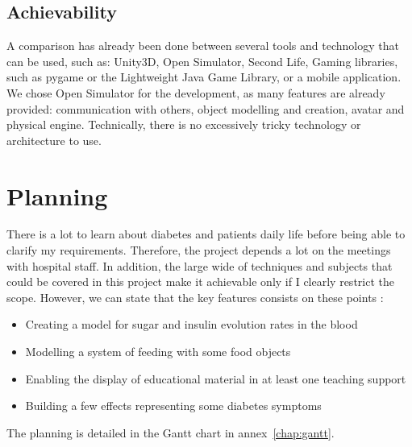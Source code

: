 \documentclass[12pt,MSc]{muthesis}
\begin{document}


\subsection*{Achievability}
A comparison has already been done between several tools and technology that can be used, such as:
Unity3D,
Open Simulator,
Second Life,
Gaming libraries, such as pygame or the Lightweight Java Game Library,
or a mobile application. 
We chose Open Simulator for the development, as many features are already provided: communication with others, object modelling and creation, avatar and physical engine.
Technically, there is no excessively tricky technology or architecture to use.

\section{Planning}

There is a lot to learn about diabetes and patients daily life before being able to clarify my requirements. Therefore, the project depends a lot on the meetings with hospital staff. In addition, the large wide of techniques and subjects that could be covered in this project make it achievable only if I clearly restrict the scope.
However, we can state that the key features consists on these points :
\begin{itemize}
\item Creating a model for sugar and insulin evolution rates in the blood
\item Modelling a system of feeding with some food objects
\item Enabling the display of educational material in at least one teaching support
\item Building a few effects representing some diabetes symptoms
\end{itemize}

The planning is detailed in the Gantt chart in annex~\ref{chap:gantt}.

 \appendix
\end{document}
